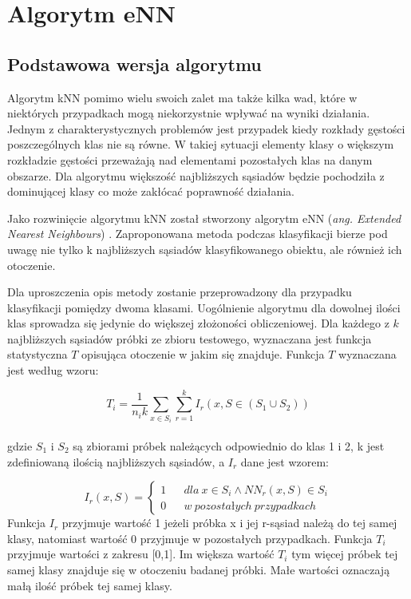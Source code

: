 \section{Algorytm eNN}
\label{chap:enn}
\subsection{Podstawowa wersja algorytmu}
Algorytm kNN pomimo wielu swoich zalet ma także kilka wad, które w niektórych przypadkach mogą niekorzystnie wpływać na wyniki działania. Jednym z charakterystycznych problemów jest przypadek kiedy rozkłady gęstości poszczególnych klas nie są równe. W takiej sytuacji elementy klasy o większym rozkładzie gęstości przeważają nad elementami pozostałych klas na danym obszarze. Dla algorytmu większość najbliższych sąsiadów będzie pochodziła z dominującej klasy co może zakłócać poprawność działania.

Jako rozwinięcie algorytmu kNN został stworzony algorytm eNN (\textit{ang. Extended Nearest Neighbours}) \cite{haibo-he}. Zaproponowana metoda podczas klasyfikacji bierze pod uwagę nie tylko k najbliższych sąsiadów klasyfikowanego obiektu, ale również ich otoczenie. 

Dla uproszczenia opis metody zostanie przeprowadzony dla przypadku klasyfikacji pomiędzy dwoma klasami. Uogólnienie algorytmu dla dowolnej ilości klas sprowadza się jedynie do większej złożoności obliczeniowej. Dla każdego z $k$ najbliższych sąsiadów próbki ze zbioru testowego, wyznaczana jest funkcja statystyczna $T$ opisująca otoczenie w jakim się znajduje. Funkcja $T$ wyznaczana jest według wzoru:

\begin{equation}
T_{i} = \frac{1}{n_i k} {\sum_{x \in S_i} \sum_{r=1}^{k} I_r (x,S \in (S_1 \cup S_2))} 
\end{equation}\\
gdzie $S_1$ i $S_2$ są zbiorami próbek należących odpowiednio do klas 1 i 2, k jest zdefiniowaną ilością najbliższych sąsiadów, a $I_r$ dane jest wzorem:

\begin{equation}
I_r(x,S) =\left\{\begin{matrix}
1 &&	dla\ x \in S_i \wedge NN_{r}(x,S) \in S_i
\\
0 &&	w\ pozostałych\ przypadkach
\end{matrix}\right.
\end{equation}
Funkcja $I_r$ przyjmuje wartość 1 jeżeli próbka x i jej r-sąsiad należą do tej samej klasy, natomiast wartość 0 przyjmuje w pozostałych przypadkach.
Funkcja $T_i$ przyjmuje wartości z zakresu [0,1]. Im większa wartość $T_i$ tym więcej próbek tej samej klasy znajduje się w otoczeniu badanej próbki. Małe wartości oznaczają małą ilość próbek tej samej klasy.

